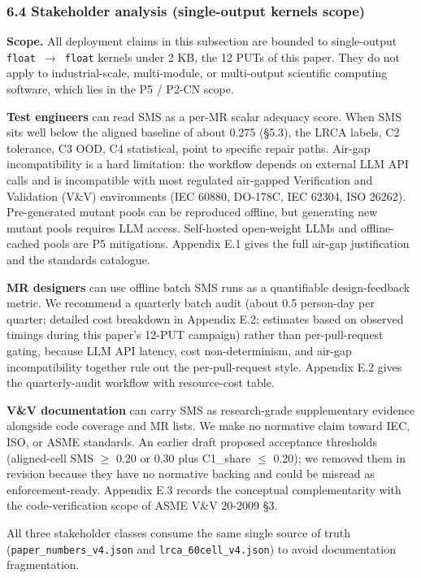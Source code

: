 \documentclass[review,12pt,authoryear]{elsarticle}
\begin{document}
\subsubsection{6.4 Stakeholder analysis (single-output kernels
scope)}\label{stakeholder-analysis-single-output-kernels-scope}

\textbf{Scope.} All deployment claims in this subsection are bounded to
single-output \texttt{float\ $\to$\ float} kernels under 2 KB, the 12 PUTs
of this paper. They do not apply to industrial-scale, multi-module, or
multi-output scientific computing software, which lies in the P5 / P2-CN
scope.

\textbf{Test engineers} can read SMS as a per-MR scalar adequacy score.
When SMS sits well below the aligned baseline of about 0.275 (§5.3), the
LRCA labels, C2 tolerance, C3 OOD, C4 statistical, point to specific
repair paths. Air-gap incompatibility is a hard limitation: the workflow
depends on external LLM API calls and is incompatible with most
regulated air-gapped Verification and Validation (V\&V) environments
(IEC 60880, DO-178C, IEC 62304, ISO 26262). Pre-generated mutant pools
can be reproduced offline, but generating new mutant pools requires LLM
access. Self-hosted open-weight LLMs and offline-cached pools are P5
mitigations. Appendix E.1 gives the full air-gap justification and the
standards catalogue.

\textbf{MR designers} can use offline batch SMS runs as a quantifiable
design-feedback metric. We recommend a quarterly batch audit (about 0.5
person-day per quarter; detailed cost breakdown in Appendix E.2;
estimates based on observed timings during this paper's 12-PUT campaign)
rather than per-pull-request gating, because LLM API latency, cost
non-determinism, and air-gap incompatibility together rule out the
per-pull-request style. Appendix E.2 gives the quarterly-audit workflow
with resource-cost table.

\textbf{V\&V documentation} can carry SMS as research-grade
supplementary evidence alongside code coverage and MR lists. We make no
normative claim toward IEC, ISO, or ASME standards. An earlier draft
proposed acceptance thresholds (aligned-cell SMS $\geq$ 0.20 or 0.30 plus
C1\_share $\leq$ 0.20); we removed them in revision because they have no
normative backing and could be misread as enforcement-ready. Appendix
E.3 records the conceptual complementarity with the code-verification
scope of ASME V\&V 20-2009 §3.

All three stakeholder classes consume the same single source of truth
(\texttt{paper\_numbers\_v4.json} and \texttt{lrca\_60cell\_v4.json}) to
avoid documentation fragmentation.
\end{document}
